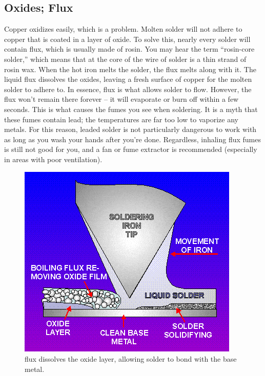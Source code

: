 \subsection{Oxides; Flux}
Copper oxidizes easily, which is a problem. Molten solder will not adhere to copper that is coated in a layer of oxide. To solve this, nearly every solder will contain flux, which is usually made of rosin. You may hear the term ``rosin-core solder,'' which means that at the core of the wire of solder is a thin strand of rosin wax. When the hot iron melts the solder, the flux melts along with it. The liquid flux dissolves the oxides, leaving a fresh surface of copper for the molten solder to adhere to. In essence, flux is what allows solder to flow. However, the flux won’t remain there forever – it will evaporate or burn off within a few seconds. This is what causes the fumes you see when soldering. It is a myth that these fumes contain lead; the temperatures are far too low to vaporize any metals. For this reason, leaded solder is not particularly dangerous to work with as long as you wash your hands after you’re done. Regardless, inhaling flux fumes is still not good for you, and a fan or fume extractor is recommended (especially in areas with poor ventilation).
\begin{figure}[h]
    \caption{flux dissolves the oxide layer, allowing solder to bond with the base metal.}
    \centering \includegraphics[scale=0.75]{images/oxidation_diagram.jpg}
\end{figure}

